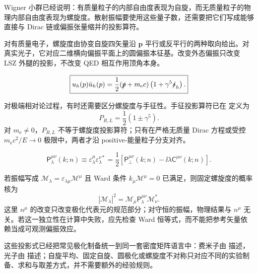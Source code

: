 Wigner 小群已经说明：有质量粒子的内部自由度表现为自旋，而无质量粒子的物理内部自由度表现为螺旋度。散射振幅要使用这些量子数，还需要把它们写成能够直接与 Dirac 链或偏振张量缩并的投影算符。

对有质量电子，螺旋度由协变自旋四矢量沿 $\mathbf p$ 平行或反平行的两种取向给出。对真实光子，它对应二维横向偏振平面上的圆偏振本征基。改变外态偏振只改变 LSZ 外腿的投影，不改变 QED 相互作用顶角本身。


\begin{equation}
 \boxed{
 u_h(p)\bar u_h(p)
 =\frac12(\slashed p+m_{\mathrm e} c)
 \left(1+\gamma^5\slashed s_h\right).}
 \label{eq:electron-helicity-projector-dp9}
\end{equation}

对极端相对论过程，有时还需要区分螺旋度与手征性。手征投影算符已在  定义为
\begin{equation*}
 P_{R,L}=\frac12(1\pm\gamma^5).
\end{equation*}
对 $m_{\mathrm e}\neq0$，$P_{R,L}$ 不等于螺旋度投影算符；只有在严格无质量 Dirac 方程或受控 $m_{\mathrm e} c^2/E\to0$ 极限中，两者才沿 positive-能量粒子分支对齐。

\begin{equation}
 \boxed{
 \mathsf P_\lambda^{\mu\nu}(k;n)
 \equiv
 \varepsilon_\lambda^\mu\varepsilon_\lambda^{\nu *}
 =\frac12\left[
 \mathsf P_\perp^{\mu\nu}(k;n)
 -\ii\lambda\mathsf C^{\mu\nu}(k;n)
 \right].}
 \label{eq:photon-helicity-projector-covariant-dp9}
\end{equation}

若振幅写成 $\mathcal M_\lambda=\varepsilon_{\lambda\mu}\mathcal M^\mu$ 且 Ward 条件 $k_\mu\mathcal M^\mu=0$ 已满足，则固定螺旋度的概率核为
\begin{equation}
 |\mathcal M_\lambda|^2
 =\mathcal M_\mu
 \mathsf P_\lambda^{\mu\nu}
 \mathcal M_\nu^*.
 \label{eq:helicity-resolved-photon-amplitude-dp9}
\end{equation}
这里 $n^\mu$ 的改变只改变极化代表元的规范部分；对守恒的振幅，物理结果与 $n^\mu$ 无关。若这一独立性在计算中失败，应先检查 Ward 恒等式，而不能把参考矢量依赖当成可观测偏振效应。

这些投影式已经把常见极化制备统一到同一套密度矩阵语言中：费米子由  描述，光子由  描述；自旋平均、固定自旋、圆极化或螺旋度不对称只对应不同的实验制备、求和与取差方式，并不需要额外的经验规则。

